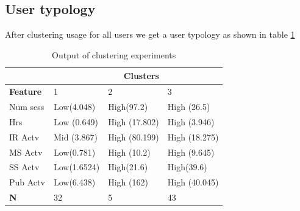 \documentclass{acm_proc_article-sp}
\begin{document}

\subsection{User typology}

After clustering usage for all users we get a user typology as shown in table \ref{usertypology}
\begin{table}
\caption{Output of clustering experiments}
\label{usertypology}
\begin{tabular}{|p{1.5cm}|p{1.5cm}|p{1.5cm}|p{1.5cm}|}
& \multicolumn{2}{r}{\textbf{Clusters}}  \\ \hline
\hline \textbf{Feature} & 1 &  2 & 3 \\ 
\hline Num sess & Low(4.048)& High(97.2)  & High (26.5)  \\ 
\hline Hrs & Low (0.649) & High (17.802) & High (3.946)  \\ 
\hline IR Actv & Mid (3.867) & High (80.199) & High (18.275) \\ 
\hline MS Actv &  Low(0.781)  & High (10.2) & High (9.645)  \\ 
\hline SS Actv  & Low(1.6524) & High(21.6) & High(39.6) \\
\hline Pub Actv & Low(6.438) & High (162) & High (40.045)  \\
\hline \textbf{N} & 32 & 5 & 43

\end{tabular}
\end{table} 
\end{document}
